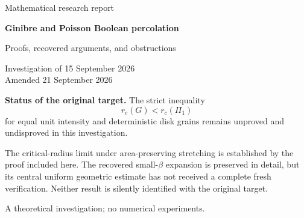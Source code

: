 \documentclass[11pt,a4paper]{article}
\theoremstyle{definition}
\theoremstyle{remark}
\numberwithin{equation}{section}
\begin{document}
\begin{titlepage}
\centering
\vspace*{20mm}
{\Large Mathematical research report\par}
\vspace{9mm}
{\huge\bfseries Ginibre and Poisson Boolean percolation\par}
\vspace{6mm}
{\Large Proofs, recovered arguments, and obstructions\par}
\vspace{15mm}
{\large Investigation of 15 September 2026\\
Amended 21 September 2026\par}
\vfill
\begin{minipage}{0.88\textwidth}
\textbf{Status of the original target.}
The strict inequality
\[
             r_c(G)<r_c(\Pi_1)
\]
for equal unit intensity and deterministic disk grains remains unproved
and undisproved in this investigation.

\medskip
The critical-radius limit under area-preserving stretching is established
by the proof included here. The recovered small-\(\beta\) expansion is
preserved in detail, but its central uniform geometric estimate has not
received a complete fresh verification. Neither result is silently
identified with the original target.
\end{minipage}
\vfill
{\small A theoretical investigation; no numerical experiments.\par}
\end{titlepage}

\begin{abstract}
This report records the investigation of the critical-radius comparison
between planar Ginibre and Poisson Boolean models. It contains complete
proofs of an optimal homogeneous Poisson domination for thinned and
rescaled Ginibre, exact Palm interpolation and Fock variational identities,
buffered conditional Bergman domination, an obstruction to uniform exterior
Palm comparison, and finite-ensemble deletion calculations. It restores
the ellipse route: fixed-eccentricity large-area comparison, quantitative
local Poisson convergence under area-preserving stretching, and a
negative-association block argument proving convergence of the actual
critical radii. It also preserves the small-\(\beta\) asymptotic argument,
with its principal geometric estimate explicitly separated from its
verified algebraic and limiting consequences. The remaining routes are
organized by their mathematical outcomes and exact obstructions.
The amended account also restores the quantitative stretching rate,
shape-variation and switching calculations, coupling barriers, the
positive-bath mixed-model comparison, conditional clearing laws, and
further certificate, transport, and finite-rank refinements.
The full original notes accompany the report; historical claims of audit
success in those notes are not used as substitutes for the proofs here.
No claim of novelty or resolution of the original strict inequality is made.
\end{abstract}
\end{document}
